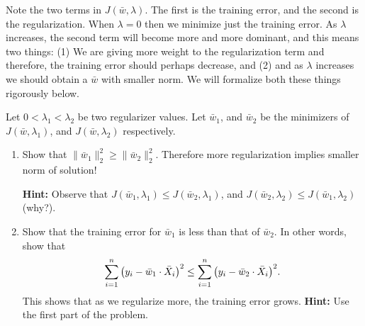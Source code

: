 \documentclass[11pt]{article}
\newenvironment{problem}[2][Problem]{\begin{trivlist}
\item[\hskip \labelsep {\bfseries #1}\hskip \labelsep {\bfseries #2.}]}{\end{trivlist}}
\begin{document}
\begin{problem}{2 (15 points) Regularization increases training error}
Note the two terms in $J(\bar w, \lambda)$. The first is the training error, and the second is the regularization. When $\lambda=0$ then we minimize just the training error. As $\lambda$ increases, the second term will become more and more dominant, and this means two things:  (1) We are giving more weight to the regularization term and therefore, the training error should perhaps decrease, and (2) and as $\lambda$ increases we should obtain a $\bar w$ with smaller norm. We will formalize both these things rigorously below. 

Let $0<\lambda_1<\lambda_2$ be two regularizer values. Let $\bar w_1$, and $\bar w_2$ be the minimizers of $J(\bar w, \lambda_1)$, and $J(\bar w, \lambda_2)$ respectively. 

\begin{enumerate}
	\item Show that $\|\bar w_1\|_2^2\ge \|\bar w_2\|_2^2$. Therefore more regularization implies smaller norm of solution!
	
	\textbf{Hint:} Observe that $J(\bar w_1, \lambda_1)\le J(\bar w_2, \lambda_1)$, and $J(\bar w_2, \lambda_2)\le J(\bar w_1, \lambda_2)$ (why?). 
	\item Show that the training error for $\bar w_1$ is less than that of $\bar w_2$. In other words, show that 
\[
\sum_{i=1}^n {\left({y_i -\bar w_1\cdot \bar X_i}\right)}^2 \le \sum_{i=1}^n {\left({y_i -\bar w_2\cdot \bar X_i}\right)}^2.
\]
This shows that as we regularize more, the training error grows.
\textbf{Hint:} Use the first part of the problem.
\end{enumerate}

\end{problem}

\end{document}
